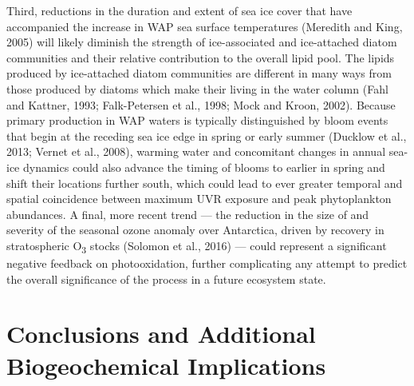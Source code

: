 Third, reductions in the duration and extent of sea ice cover that have accompanied the increase in WAP sea surface temperatures (Meredith and King, 2005) will likely diminish the strength of ice-associated and ice-attached diatom communities and their relative contribution to the overall lipid pool. The lipids produced by ice-attached diatom communities are different in many ways from those produced by diatoms which make their living in the water column (Fahl and Kattner, 1993; Falk-Petersen et al., 1998; Mock and Kroon, 2002). Because primary production in WAP waters is typically distinguished by bloom events that begin at the receding sea ice edge in spring or early summer (Ducklow et al., 2013; Vernet et al., 2008), warming water and concomitant changes in annual sea-ice dynamics could also advance the timing of blooms to earlier in spring and shift their locations further south, which could lead to ever greater temporal and spatial coincidence between maximum UVR exposure and peak phytoplankton abundances. A final, more recent trend --- the reduction in the size of and severity of the seasonal ozone anomaly over Antarctica, driven by recovery in stratospheric O\textsubscript{3} stocks (Solomon et al., 2016) --- could represent a significant negative feedback on photooxidation, further complicating any attempt to predict the overall significance of the process in a future ecosystem state.

\section{Conclusions and Additional Biogeochemical Implications}

